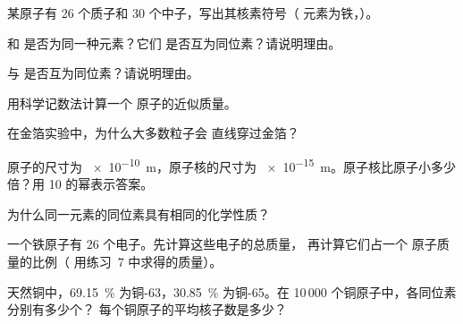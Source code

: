 \begin{exercise}[$\star$]\label{exo:g9:inside-the-atom:4}
某原子有 26 个质子和 30 个中子，写出其核素符号（
元素为铁，）。
\end{exercise}

\begin{exercise}[$\star\star$]\label{exo:g9:inside-the-atom:5}
 和  是否为同一种元素？它们
是否互为同位素？请说明理由。
\end{exercise}

\begin{exercise}[$\star\star$]\label{exo:g9:inside-the-atom:6}
 与  是否互为同位素？请说明理由。
\end{exercise}

\begin{exercise}[$\star\star$]\label{exo:g9:inside-the-atom:7}
用科学记数法计算一个
 原子的近似质量。
\end{exercise}

\begin{exercise}[$\star\star$]\label{exo:g9:inside-the-atom:8}
在金箔实验中，为什么大多数粒子会
直线穿过金箔？
\end{exercise}

\begin{exercise}[$\star\star$]\label{exo:g9:inside-the-atom:9}
原子的尺寸为 \qty{e-10}{m}，原子核的尺寸为
\qty{e-15}{m}。原子核比原子小多少倍？用 10 的幂表示答案。
\end{exercise}

\begin{exercise}[$\star\star$]\label{exo:g9:inside-the-atom:10}
为什么同一元素的同位素具有相同的化学性质？
\end{exercise}

\begin{exercise}[$\star\star\star$]\label{exo:g9:inside-the-atom:11}
一个铁原子有 26 个电子。先计算这些电子的总质量，
再计算它们占一个  原子质量的比例（
用练习~7 中求得的质量）。
\end{exercise}

\begin{exercise}[$\star\star\star$]\label{exo:g9:inside-the-atom:12}
天然铜中，\qty{69.15}{\percent} 为铜-63，\qty{30.85}{\percent}
为铜-65。在 10\,000 个铜原子中，各同位素分别有多少个？
每个铜原子的平均核子数是多少？
\end{exercise}

\clearpage %
